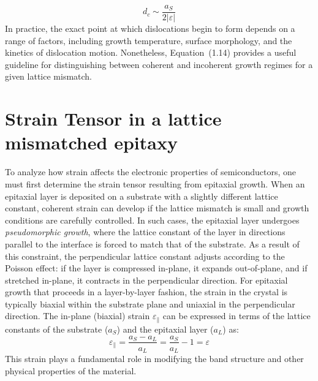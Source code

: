 \begin{equation*}
	d_c \sim \frac{a_S}{2|\varepsilon|}
\end{equation*}
In practice, the exact point at which dislocations begin to form depends on a range of factors, including growth temperature, surface morphology, and the kinetics of dislocation motion. Nonetheless, Equation~(1.14) provides a useful guideline for distinguishing between coherent and incoherent growth regimes for a given lattice mismatch.


\section{Strain Tensor in a lattice mismatched epitaxy}
To analyze how strain affects the electronic properties of semiconductors, one must first determine the strain tensor resulting from epitaxial growth. When an epitaxial layer is deposited on a substrate with a slightly different lattice constant, coherent strain can develop if the lattice mismatch is small and growth conditions are carefully controlled.
In such cases, the epitaxial layer undergoes \textit{pseudomorphic growth}, where the lattice constant of the layer in directions parallel to the interface is forced to match that of the substrate. As a result of this constraint, the perpendicular lattice constant adjusts according to the Poisson effect: if the layer is compressed in-plane, it expands out-of-plane, and if stretched in-plane, it contracts in the perpendicular direction.
For epitaxial growth that proceeds in a layer-by-layer fashion, the strain in the crystal is typically biaxial within the substrate plane and uniaxial in the perpendicular direction. The in-plane (biaxial) strain $\varepsilon_\parallel$ can be expressed in terms of the lattice constants of the substrate ($a_S$) and the epitaxial layer ($a_L$) as:
\begin{equation*}
	\varepsilon_\parallel = \frac{a_S - a_L}{a_L} = \frac{a_S}{a_L} - 1 = \varepsilon
\end{equation*}
This strain plays a fundamental role in modifying the band structure and other physical properties of the material.

